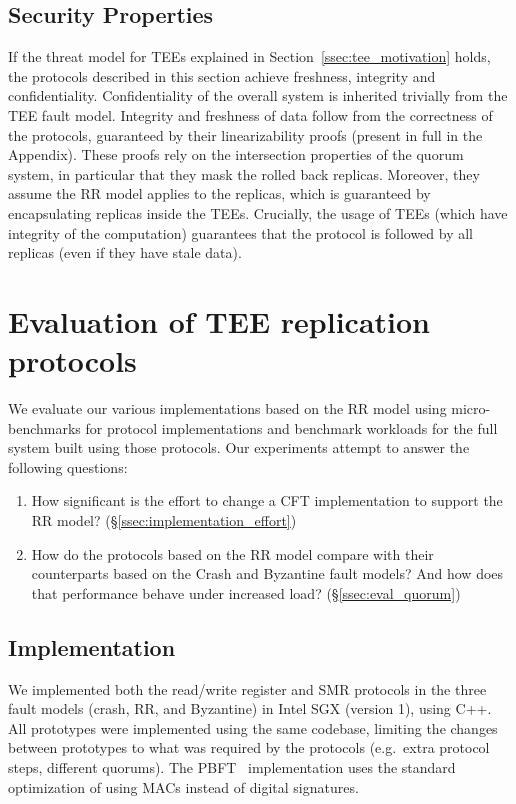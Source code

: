 \subsection{Security Properties}\label{ssec:sec_prop}
If the threat model for \acp{TEE} explained in
Section~\ref{ssec:tee_motivation} holds, the protocols described in this
section achieve freshness, integrity and confidentiality.
Confidentiality of the overall system is inherited trivially from the
\ac{TEE} fault model. Integrity and freshness of data follow from the
correctness of the protocols, guaranteed by their linearizability
proofs (present in full in the Appendix). These proofs rely on
the intersection properties of the quorum system, in particular
that they mask the rolled back replicas. Moreover, they assume the
\ac{RR} model applies to the replicas, which is
guaranteed by encapsulating replicas inside the \acp{TEE}. Crucially,
the usage of \acp{TEE} (which have integrity of the computation)
guarantees that the protocol is followed by all replicas (even if
they have stale data).

\section{Evaluation of \ac{TEE} replication protocols}

We evaluate our various implementations based on the \ac{RR}
model using micro-benchmarks for protocol implementations and
benchmark workloads for the full system built using those
protocols. Our experiments attempt to answer the following
questions:

\begin{enumerate}
    \item How significant is the effort to change a \ac{CFT}
        implementation to support the \ac{RR} model?
        (\S\ref{ssec:implementation_effort})
    \item How do the protocols based on the \ac{RR} model
      compare with their counterparts based on the Crash and Byzantine
      fault models? And how does that performance behave under increased load?  (\S\ref{ssec:eval_quorum})
\end{enumerate}

\subsection{Implementation}\label{ssec:impl}

We implemented both the read/write register and SMR protocols in
the three fault models (crash, \ac{RR}, and Byzantine) in Intel
SGX (version 1), using C++. All prototypes were implemented using
the same codebase, limiting the changes between prototypes to
what was required by the protocols (e.g.\ extra protocol steps,
different quorums). The PBFT~\cite{pbft} implementation uses the
standard optimization of using MACs instead of digital
signatures.

